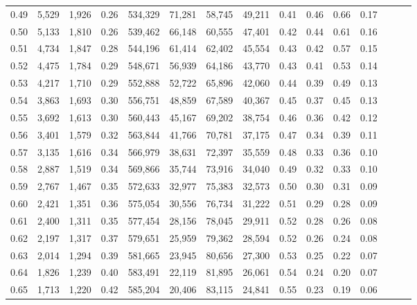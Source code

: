 \begin{tabular}{rrrrrrrrrrrrrrr}
0.49 &   5,529 &  1,926 &  0.26 &  534,329 &   71,281 &   58,745 &   49,211 &  0.41 &  0.46 &  0.66 &      0.17 \\
0.50 &   5,133 &  1,810 &  0.26 &  539,462 &   66,148 &   60,555 &   47,401 &  0.42 &  0.44 &  0.61 &      0.16 \\
0.51 &   4,734 &  1,847 &  0.28 &  544,196 &   61,414 &   62,402 &   45,554 &  0.43 &  0.42 &  0.57 &      0.15 \\
0.52 &   4,475 &  1,784 &  0.29 &  548,671 &   56,939 &   64,186 &   43,770 &  0.43 &  0.41 &  0.53 &      0.14 \\
0.53 &   4,217 &  1,710 &  0.29 &  552,888 &   52,722 &   65,896 &   42,060 &  0.44 &  0.39 &  0.49 &      0.13 \\
0.54 &   3,863 &  1,693 &  0.30 &  556,751 &   48,859 &   67,589 &   40,367 &  0.45 &  0.37 &  0.45 &      0.13 \\
0.55 &   3,692 &  1,613 &  0.30 &  560,443 &   45,167 &   69,202 &   38,754 &  0.46 &  0.36 &  0.42 &      0.12 \\
0.56 &   3,401 &  1,579 &  0.32 &  563,844 &   41,766 &   70,781 &   37,175 &  0.47 &  0.34 &  0.39 &      0.11 \\
0.57 &   3,135 &  1,616 &  0.34 &  566,979 &   38,631 &   72,397 &   35,559 &  0.48 &  0.33 &  0.36 &      0.10 \\
0.58 &   2,887 &  1,519 &  0.34 &  569,866 &   35,744 &   73,916 &   34,040 &  0.49 &  0.32 &  0.33 &      0.10 \\
0.59 &   2,767 &  1,467 &  0.35 &  572,633 &   32,977 &   75,383 &   32,573 &  0.50 &  0.30 &  0.31 &      0.09 \\
0.60 &   2,421 &  1,351 &  0.36 &  575,054 &   30,556 &   76,734 &   31,222 &  0.51 &  0.29 &  0.28 &      0.09 \\
0.61 &   2,400 &  1,311 &  0.35 &  577,454 &   28,156 &   78,045 &   29,911 &  0.52 &  0.28 &  0.26 &      0.08 \\
0.62 &   2,197 &  1,317 &  0.37 &  579,651 &   25,959 &   79,362 &   28,594 &  0.52 &  0.26 &  0.24 &      0.08 \\
0.63 &   2,014 &  1,294 &  0.39 &  581,665 &   23,945 &   80,656 &   27,300 &  0.53 &  0.25 &  0.22 &      0.07 \\
0.64 &   1,826 &  1,239 &  0.40 &  583,491 &   22,119 &   81,895 &   26,061 &  0.54 &  0.24 &  0.20 &      0.07 \\
0.65 &   1,713 &  1,220 &  0.42 &  585,204 &   20,406 &   83,115 &   24,841 &  0.55 &  0.23 &  0.19 &      0.06 \\

\end{tabular}
